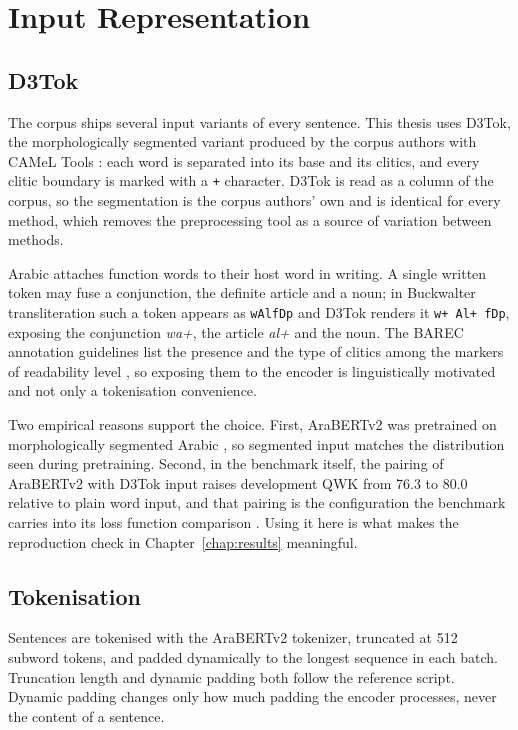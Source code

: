 \section{Input Representation}
\label{sec:meth-input}

\subsection{D3Tok}

The corpus ships several input variants of every sentence. This thesis uses D3Tok, the
morphologically segmented variant produced by the corpus authors with CAMeL Tools
\cite{obeid2020camel}: each word is separated into its base and its clitics, and every clitic
boundary is marked with a \texttt{+} character. D3Tok is read as a column of the corpus, so the
segmentation is the corpus authors' own and is identical for every method, which removes the
preprocessing tool as a source of variation between methods.

Arabic attaches function words to their host word in writing. A single written token may fuse a
conjunction, the definite article and a noun; in Buckwalter transliteration such a token
appears as \texttt{wAlfDp} and D3Tok renders it \texttt{w+ Al+ fDp}, exposing the conjunction
\textit{wa+}, the article \textit{al+} and the noun. The BAREC annotation guidelines list the
presence and the type of clitics among the markers of readability level
\cite{habash2025guidelines}, so exposing them to the encoder is linguistically motivated and
not only a tokenisation convenience.

Two empirical reasons support the choice. First, AraBERTv2 was pretrained on morphologically
segmented Arabic \cite{antoun2020arabert}, so segmented input matches the distribution seen
during pretraining. Second, in the benchmark itself, the pairing of AraBERTv2 with D3Tok input
raises development QWK from 76.3 to 80.0 relative to plain word input, and that pairing is the
configuration the benchmark carries into its loss function comparison
\cite{elmadani2025barec}. Using it here is what makes the reproduction check in
Chapter~\ref{chap:results} meaningful.

\subsection{Tokenisation}

Sentences are tokenised with the AraBERTv2 tokenizer, truncated at 512 subword tokens, and
padded dynamically to the longest sequence in each batch. Truncation length and dynamic padding
both follow the reference script. Dynamic padding changes only how much padding the encoder
processes, never the content of a sentence.

